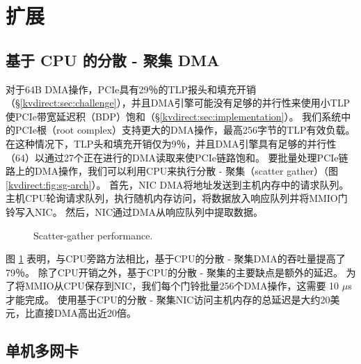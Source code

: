 \section{扩展}
\label{kvdirect:sec:extensions}

\subsection{基于 CPU 的分散 - 聚集 DMA}


对于64B DMA操作，PCIe具有29％的TLP报头和填充开销（\S \ref {kvdirect:sec:challenge}），并且DMA引擎可能没有足够的并行性来使用小TLP使PCIe带宽延迟积（BDP）饱和（\S\ref{kvdirect:sec:implementation}）。
我们系统中的PCIe根（root complex）支持更大的DMA操作，最高256字节的TLP有效负载。 在这种情况下，TLP头和填充开销仅为9％，并且DMA引擎具有足够的并行性（64）以通过27个正在进行的DMA读取来使PCIe链路饱和。
要批量处理PCIe链路上的DMA操作，我们可以利用CPU来执行分散 - 聚集（scatter gather）（图 \ref {kvdirect:fig:sg-arch}）。
首先，NIC DMA将地址发送到主机内存中的请求队列。 主机CPU轮询请求队列，执行随机内存访问，将数据放入响应队列并将MMIO门铃写入NIC。 然后，NIC通过DMA从响应队列中提取数据。

\begin{figure}[t]
\centering
{}
\caption{Scatter-gather performance.}
\label{kvdirect:fig:scatter-gather}

\end{figure}

图 \ref {kvdirect:fig:scatter-gather} 表明，与CPU旁路方法相比，基于CPU的分散 - 聚集DMA的吞吐量提高了79％。
除了CPU开销之外，基于CPU的分散 - 聚集的主要缺点是额外的延迟。
为了将MMIO从CPU保存到NIC，我们每个门铃批量256个DMA操作，这需要 10 $\mu$s 才能完成。
使用基于CPU的分散 - 聚集NIC访问主机内存的总延迟是大约20美元，比直接DMA高出近20倍。

\subsection{单机多网卡}
\label{kvdirect:sec:multi-nic}

